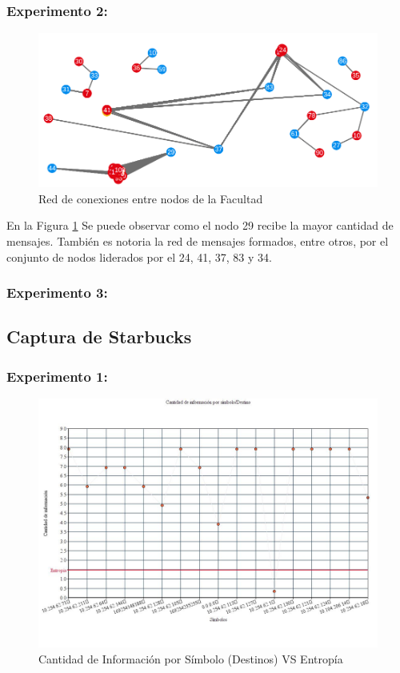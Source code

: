 \subsubsection{Experimento 2:}

\begin{figure}[H]
  \centering
    \includegraphics[scale=0.6]{imagenes/graficos/grafos/facultad.png}
  \caption{Red de conexiones entre nodos de la Facultad}
  \label{fig:9}
\end{figure}

En la Figura \ref{fig:9} Se puede observar como el nodo 29 recibe la mayor cantidad de mensajes. También es notoria la red de mensajes formados, entre otros, por el conjunto de nodos liderados por el 24, 41, 37, 83 y 34.

\subsubsection{Experimento 3: }


\newpage
\subsection{Captura de Starbucks}

\subsubsection{Experimento 1:}


\begin{figure}[H]
  \centering
    \includegraphics[scale=0.45]{imagenes/graficos/entropiaCantInf/04destino.jpg}
  \caption{Cantidad de Información por Símbolo (Destinos) VS Entropía}
  \label{fig:10}
\end{figure}

